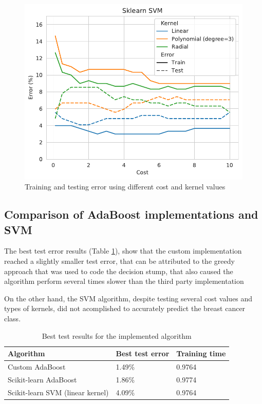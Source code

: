 \documentclass[11pt,twocolumn,letterpaper]{article}
\begin{document}
\begin{figure}[h]
	\begin{center}
		\includegraphics[width=1.0\linewidth]{cost_kernel_svm.pdf}
	\end{center}
	\caption{Training and testing error using different cost and kernel values}
	\label{fig:svm}
\end{figure}

\subsection{Comparison of AdaBoost implementations and SVM}

The best test error results (Table \ref{table:results}), show that the custom implementation reached a slightly smaller test error, that can be attributed to the greedy approach that was used to code the decision stump, that also caused the algorithm perform several times slower than the third party implementation

On the other hand, the SVM algorithm, despite testing several cost values and types of kernels, did not acomplished to accurately predict the breast cancer class.

\begin{table}[h]
	\begin{center}
		\begin{tabular}{|p{4cm}|p{1.5cm}|p{1.5cm}|}
			\hline
			Algorithm & Best test error & Training time \\
			\hline\hline
			Custom AdaBoost & 1.49\% & 0.9764\\
			Scikit-learn AdaBoost & 1.86\% & 0.9774\\
			Scikit-learn SVM (linear kernel) & 4.09\% & 0.9764\\
			\hline
		\end{tabular}
	\end{center}
	\caption{Best test results for the implemented algorithm}
	\label{table:results}
\end{table}
\end{document}
